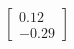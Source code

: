 \documentclass[preview]{standalone}
\begin{document}
\begin{align*}
\begin{bmatrix} 0.12 \\ -0.29 \end{bmatrix}
\end{align*}
\end{document}
